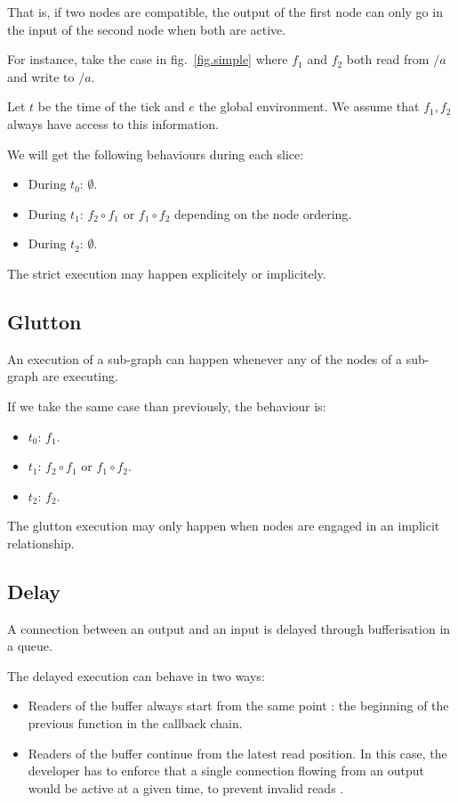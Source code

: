 \documentclass{article}
\begin{document}
That is, if two nodes are compatible, the output of the first node can only go in the input of the second node when both are active.
    
For instance, take the case in fig.~\ref{fig.simple} where $f_1$ and $f_2$ both read from $/a$ and write to $/a$.
    
Let $t$ be the time of the tick and $e$ the global environment. 
We assume that $f_1, f_2$ always have access to this information.
    
We will get the following behaviours during each slice: 
\begin{itemize}
  \item During $t_0$: $\emptyset$.
  \item During $t_1$: $f_2 \circ f_1 $ or $f_1 \circ f_2$ depending on the node ordering.
  \item During $t_2$: $\emptyset$. 
\end{itemize}

The strict execution may happen explicitely or implicitely.
    
\subsection{Glutton}
An execution of a sub-graph can happen whenever any of the nodes of a sub-graph are executing. 
    
If we take the same case than previously, the behaviour is:
\begin{itemize}
  \item $t_0$: $f_1$.
  \item $t_1$: $f_2 \circ f_1$ or $f_1 \circ f_2$.
  \item $t_2$: $f_2$. 
\end{itemize}

The glutton execution may only happen when nodes are engaged in an implicit relationship.
    
\subsection{Delay}
A connection between an output and an input is delayed through bufferisation in a queue.
	
The delayed execution can behave in two ways:
\begin{itemize}
  \item Readers of the buffer always start from the same point : the beginning of the previous function in the callback chain.
  \item Readers of the buffer continue from the latest read position.
        In this case, the developer has to enforce that a single connection flowing from an output would be active at a given time, to prevent invalid reads .%
\end{itemize}
\end{document}
